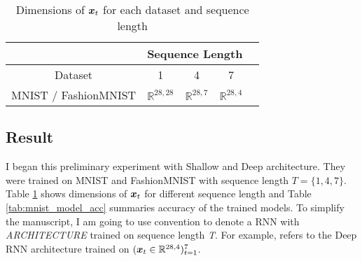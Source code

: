  
 
\renewcommand{\arraystretch}{1.5}
\begin{table}[h]
\centering
\begin{tabular}{l|l|l|l|l|}
\cline{2-4}
                                            & \multicolumn{3}{c|}{Sequence Length}                                                               \\ \hline
\multicolumn{1}{|c|}{Dataset}               & \multicolumn{1}{c|}{1} & \multicolumn{1}{c|}{4} & \multicolumn{1}{c|}{7}  \\ \hline
\multicolumn{1}{|l|}{MNIST / FashionMNIST} &        $ \mathbb{R}^{28,28}  $              &          $ \mathbb{R}^{28,7}  $               &         $ \mathbb{R}^{28,4}  $                            \\ \hline
\end{tabular}
\caption{Dimensions of $\patvector{x}_t$ for each dataset and sequence length}
\label{tab:seq-length}

\end{table}
\renewcommand{\arraystretch}{1}



\subsection{Result}
I began this preliminary experiment  with Shallow and Deep architecture. They were trained on MNIST and FashionMNIST with sequence length $T = \{1, 4, 7\}$. Table \ref{tab:seq-length} shows dimensions of $\patvector{x}_t$ for different sequence length and Table \ref{tab:mnist_model_acc} summaries accuracy of the trained models. To simplify the manuscript, I am going to use \textit{} convention to denote a RNN with \textit{ARCHITECTURE} trained on sequence length \textit{T}. For example,  refers to the Deep RNN architecture trained on $(\boldsymbol{x}_t \in \mathbb{R}^{28,4} )_{t=1}^{7}$.


